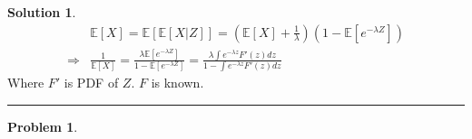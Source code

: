 \documentclass[a4paper, 10pt]{article}
\theoremstyle{definition}
\newtheorem{problem}{Problem}
\theoremstyle{hSol}
\newtheorem*{solution}{Solution}
\begin{document}
\begin{solution}
\begin{equation}
  \begin{split}
    &\mathbb{E}\left[X\right] = \mathbb{E}\left[\mathbb{E}\left[X|Z\right]\right] = \left(\mathbb{E}\left[X\right]+\frac{1}{\lambda}\right)(1- \mathbb{E}\left[e^{-\lambda Z}\right]) \\
    \Rightarrow & \frac{1}{\mathbb{E}\left[X\right]} = \frac{\lambda \mathbb{E}\left[e^{-\lambda Z}\right]}{1-\mathbb{E}\left[e^{-\lambda Z}\right]} = \frac{\lambda \int e^{-\lambda z}F'(z)dz}{1-\int e^{-\lambda z}F'(z)dz}
  \end{split}
\end{equation}
Where $F'$ is PDF of $Z$. $F$ is known. 
\end{solution}

\noindent\rule{16cm}{0.4pt}
\begin{problem} 
\end{problem}
\end{document}
